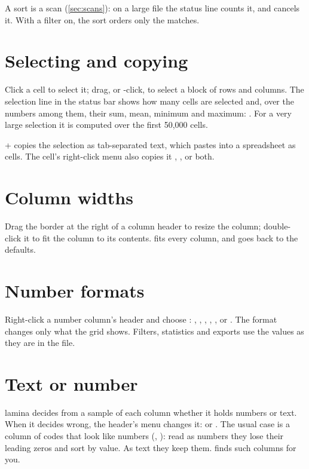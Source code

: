 A sort is a scan (\cref{sec:scans}): on a large file the status line counts it, and  cancels
it. With a filter on, the sort orders only the matches.

\section{Selecting and copying}\label{sec:selection}

Click a cell to select it; drag, or -click, to select a block of rows and columns. The
selection line in the status bar shows how many cells are selected and, over the numbers among them,
their sum, mean, minimum and maximum: . For
a very large selection it is computed over the first 50{,}000 cells.

+ copies the selection as tab-separated text, which pastes into a spreadsheet as cells.
The cell's right-click menu also copies it , , or both.

\section{Column widths}

Drag the border at the right of a column header to resize the column; double-click it to fit the column
to its contents.  fits every column, and 
goes back to the defaults.

\section{Number formats}\label{sec:formats}

Right-click a number column's header and choose : , ,
, , ,  or . The format
changes only what the grid shows. Filters, statistics and exports use the values as they are in the
file.

\section{Text or number}\label{sec:text-number}

lamina decides from a sample of each column whether it holds numbers or text. When it decides wrong, the
header's menu changes it:  or . The usual case is a column of codes
that look like numbers (, ): read as numbers they lose their leading zeros and sort
by value. As text they keep them.  finds such columns for you.

